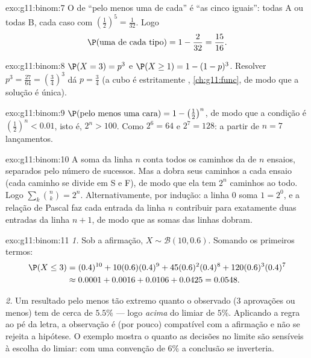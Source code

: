 \begin{solution}{exo:g11:binom:7}
O  de ``pelo menos uma de cada'' é ``as cinco iguais'':
todas A ou todas B, cada caso com 
$\left(\frac12\right)^5 = \frac1{32}$. Logo
\[
\P(\text{uma de cada tipo}) = 1 - \frac{2}{32} = \frac{15}{16} .
\]
\end{solution}

\begin{solution}{exo:g11:binom:8}
$\P(X = 3) = p^3$ e $\P(X \geq 1) = 1 - (1-p)^3$. Resolver
$p^3 = \frac{27}{64} = \left(\frac34\right)^3$ dá $p = \frac34$ (a 
cubo é estritamente , \cref{ch:g11:func}, de modo que a solução
é única).
\end{solution}

\begin{solution}{exo:g11:binom:9}
$\P(\text{pelo menos uma cara}) = 1 - \left(\frac12\right)^n$, de modo
que a condição é $\left(\frac12\right)^n < 0.01$, isto é, $2^n > 100$.
Como $2^6 = 64$ e $2^7 = 128$: a partir de $n = 7$ lançamentos.
\end{solution}

\begin{solution}{exo:g11:binom:10}
A soma da linha $n$ conta todos os caminhos da  de $n$ ensaios,
separados pelo número de sucessos. Mas a  dobra seus caminhos a
cada ensaio (cada caminho se divide em S e F), de modo que ela tem $2^n$
caminhos ao todo. Logo $\sum_{k} \binom nk = 2^n$. Alternativamente, por
indução: a linha $0$ soma $1 = 2^0$, e a relação de Pascal faz cada
entrada da linha $n$ contribuir para exatamente duas entradas da linha
$n+1$, de modo que as somas das linhas dobram.
\end{solution}

\begin{solution}{exo:g11:binom:11}
\emph{1.} Sob a afirmação, $X \sim \mathcal B(10, 0.6)$. Somando os
primeiros termos:
\begin{align*}
\P(X \leq 3)
&= (0.4)^{10} + 10(0.6)(0.4)^9 + 45(0.6)^2(0.4)^8
+ 120(0.6)^3(0.4)^7\\
&\approx 0.0001 + 0.0016 + 0.0106 + 0.0425 = 0.0548 .
\end{align*}

\emph{2.} Um resultado pelo menos tão extremo quanto o observado ($3$
aprovações ou menos) tem  de cerca de $5.5\%$ --- logo
\emph{acima} do limiar de $5\%$. Aplicando a regra ao pé da letra, a
observação é (por pouco) compatível com a afirmação e não se rejeita a
hipótese. O exemplo mostra o quanto as decisões no limite são sensíveis à
escolha do limiar: com uma convenção de $6\%$ a conclusão se inverteria.
\end{solution}

